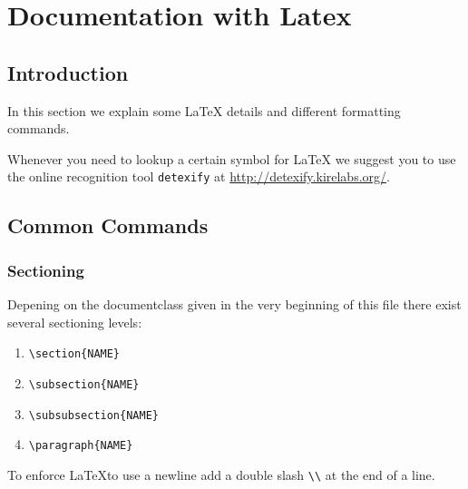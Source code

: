 \documentclass[10pt,a4paper]{scrartcl}
\begin{document}
\section{Documentation with Latex}
\subsection{Introduction} 

In this section we explain some \LaTeX\xspace details and different formatting
commands.

Whenever you need to lookup a certain symbol for \LaTeX\xspace we suggest you to use
the online recognition tool \texttt{detexify} at \url{http://detexify.kirelabs.org/}.


\subsection{Common Commands}
\subsubsection{Sectioning}
Depening on the documentclass given in the very beginning of this file there
exist several sectioning levels:
\begin{enumerate}
	\item{} \verb$\section{NAME}$
	\item{} \verb$\subsection{NAME}$
	\item{} \verb$\subsubsection{NAME}$
	\item{} \verb$\paragraph{NAME}$
\end{enumerate}

\noindent To enforce \LaTeX to use a newline add a double slash \verb$\\$ at 
the end of a line.
\end{document}
